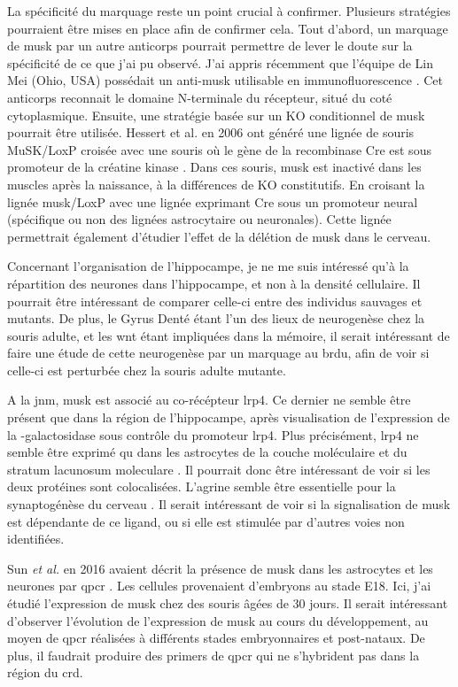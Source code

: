 La spécificité du marquage reste un point crucial à confirmer. Plusieurs stratégies pourraient être mises en place afin de confirmer cela. Tout d'abord, un marquage de \gls{musk} par un autre anticorps pourrait permettre de lever le doute sur la spécificité de ce que j'ai pu observé. J'ai appris récemment que l'équipe de Lin Mei (Ohio, USA) possédait un anti-\gls{musk} utilisable en immunofluorescence \cite{Amenta2012}. Cet anticorps reconnait le domaine N-terminale du récepteur, situé du coté cytoplasmique. Ensuite, une stratégie basée sur un KO conditionnel de \gls{musk} pourrait être utilisée. Hessert et al. en 2006 ont généré une lignée de souris MuSK/LoxP croisée avec une souris où le gène de la recombinase Cre est sous promoteur de la créatine kinase \cite{Hesser2006}. Dans ces souris, \gls{musk} est inactivé dans les muscles après la naissance, à la différences de KO constitutifs. En croisant la lignée \gls{musk}/LoxP avec une lignée exprimant Cre sous un promoteur neural (spécifique ou non des lignées astrocytaire ou neuronales). Cette lignée permettrait également d'étudier l'effet de la délétion de \gls{musk} dans le cerveau.

Concernant l'organisation de l'hippocampe, je ne me suis intéressé qu'à la répartition des neurones dans l'hippocampe, et non à la densité cellulaire. Il pourrait être intéressant de comparer celle-ci entre des individus sauvages et mutants. De plus, le Gyrus Denté étant l'un des lieux de neurogenèse chez la souris adulte, et les \gls{wnt} étant impliquées dans la mémoire, il serait intéressant de faire une étude de cette neurogenèse par un marquage au \gls{brdu}, afin de voir si celle-ci est perturbée chez la souris adulte mutante.

A la \gls{jnm}, \gls{musk} est associé au co-récépteur \gls{lrp}4. Ce dernier ne semble être présent que dans la région de l'hippocampe, après visualisation de l'expression de la \textbeta{}-galactosidase sous contrôle du promoteur \gls{lrp}4. Plus précisément, \gls{lrp}4 ne semble être exprimé qu dans les astrocytes de la couche moléculaire et du stratum lacunosum moleculare \cite{Sun2016}. Il pourrait donc être intéressant de voir si les deux protéines sont colocalisées. L'agrine semble être essentielle pour la synaptogénèse du cerveau \cite{Cohen1997, Bose2000, Sun2016}. Il serait intéressant de voir si la signalisation de \gls{musk} est dépendante de ce ligand, ou si elle est stimulée par d'autres voies non identifiées.

Sun \emph{et al.} en 2016 avaient décrit la présence de \gls{musk} dans les astrocytes et les neurones par \gls{qpcr} \cite{Sun2016}. Les cellules provenaient d'embryons au stade E18. Ici, j'ai étudié l'expression de \gls{musk} chez des souris âgées de 30 jours. Il serait intéressant d'observer l'évolution de l'expression de \gls{musk} au cours du développement, au moyen de \gls{qpcr} réalisées à différents stades embryonnaires et post-nataux. De plus, il faudrait produire des primers de \gls{qpcr} qui ne s'hybrident pas dans la région du \gls{crd}.

